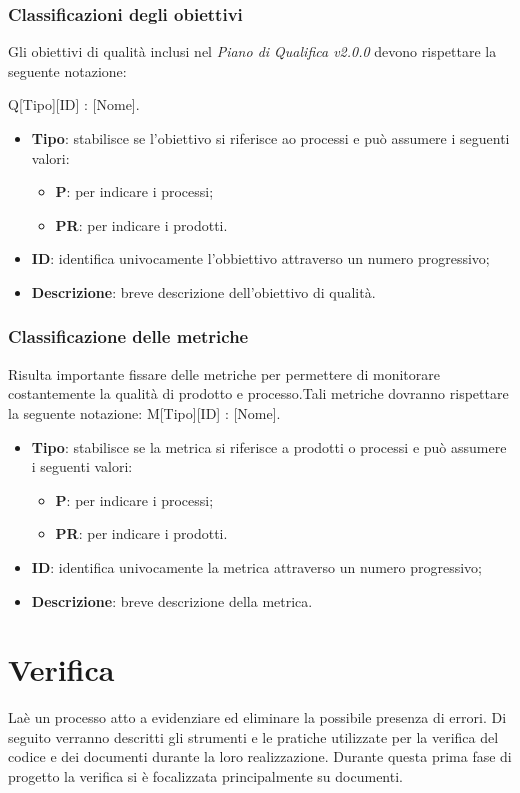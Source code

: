 \subsubsection{Classificazioni degli obiettivi} 
Gli obiettivi di qualità inclusi nel \textit{Piano di Qualifica v2.0.0} devono rispettare la seguente notazione: \\
\begin{center}
Q[Tipo][ID] : [Nome].
\end{center}
\begin{itemize}
	\item \textbf{Tipo}: stabilisce se l'obiettivo si riferisce ao processi e può assumere i seguenti valori:
	\begin{itemize}
		\item \textbf{P}: per indicare i processi;
		\item \textbf{PR}: per indicare i prodotti.
	\end{itemize}
	\item \textbf{ID}: identifica univocamente l'obbiettivo attraverso un numero progressivo;
	\item \textbf{Descrizione}: breve descrizione dell'obiettivo di qualità.
\end{itemize}
\subsubsection{Classificazione delle metriche}
Risulta importante fissare delle metriche per permettere di monitorare costantemente la qualità di prodotto e processo.Tali metriche dovranno rispettare la seguente notazione:
M[Tipo][ID] : [Nome].\\
\begin{itemize}
	\item \textbf{Tipo}: stabilisce se la metrica si riferisce a prodotti o processi e può assumere i seguenti valori:
	\begin{itemize}
		\item \textbf{P}: per indicare i processi;
		\item \textbf{PR}: per indicare i prodotti.
	\end{itemize}
	\item \textbf{ID}: identifica univocamente la metrica attraverso un numero progressivo;
	\item \textbf{Descrizione}: breve descrizione della metrica.
\end{itemize}

\section{Verifica}
Laè un processo atto a evidenziare ed eliminare la possibile presenza di errori.
Di seguito verranno descritti gli strumenti e le pratiche utilizzate per la verifica del codice e dei documenti durante la loro realizzazione.
Durante questa prima fase di progetto la verifica si è focalizzata principalmente su documenti.

